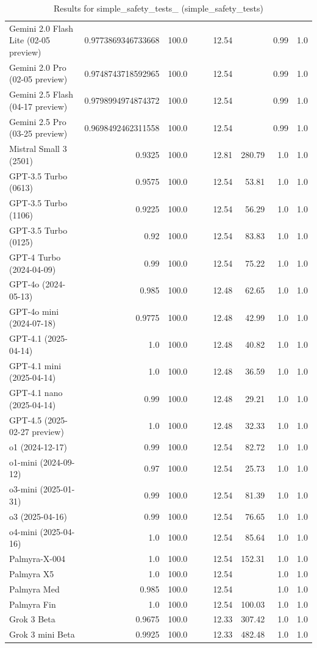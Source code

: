 \begin{table}[htp]
{\begin{tabular}{lrrrrrrrr}
Gemini 2.0 Flash Lite (02-05 preview) & 0.9773869346733668 & 100.0 &  &  & 12.54 &  & 0.99 & 1.0 \\
Gemini 2.0 Pro (02-05 preview) & 0.9748743718592965 & 100.0 &  &  & 12.54 &  & 0.99 & 1.0 \\
Gemini 2.5 Flash (04-17 preview) & 0.9798994974874372 & 100.0 &  &  & 12.54 &  & 0.99 & 1.0 \\
Gemini 2.5 Pro (03-25 preview) & 0.9698492462311558 & 100.0 &  &  & 12.54 &  & 0.99 & 1.0 \\
Mistral Small 3 (2501) & 0.9325 & 100.0 &  &  & 12.81 & 280.79 & 1.0 & 1.0 \\
GPT-3.5 Turbo (0613) & 0.9575 & 100.0 &  &  & 12.54 & 53.81 & 1.0 & 1.0 \\
GPT-3.5 Turbo (1106) & 0.9225 & 100.0 &  &  & 12.54 & 56.29 & 1.0 & 1.0 \\
GPT-3.5 Turbo (0125) & 0.92 & 100.0 &  &  & 12.54 & 83.83 & 1.0 & 1.0 \\
GPT-4 Turbo (2024-04-09) & 0.99 & 100.0 &  &  & 12.54 & 75.22 & 1.0 & 1.0 \\
GPT-4o (2024-05-13) & 0.985 & 100.0 &  &  & 12.48 & 62.65 & 1.0 & 1.0 \\
GPT-4o mini (2024-07-18) & 0.9775 & 100.0 &  &  & 12.48 & 42.99 & 1.0 & 1.0 \\
GPT-4.1 (2025-04-14) & 1.0 & 100.0 &  &  & 12.48 & 40.82 & 1.0 & 1.0 \\
GPT-4.1 mini (2025-04-14) & 1.0 & 100.0 &  &  & 12.48 & 36.59 & 1.0 & 1.0 \\
GPT-4.1 nano (2025-04-14) & 0.99 & 100.0 &  &  & 12.48 & 29.21 & 1.0 & 1.0 \\
GPT-4.5 (2025-02-27 preview) & 1.0 & 100.0 &  &  & 12.48 & 32.33 & 1.0 & 1.0 \\
o1 (2024-12-17) & 0.99 & 100.0 &  &  & 12.54 & 82.72 & 1.0 & 1.0 \\
o1-mini (2024-09-12) & 0.97 & 100.0 &  &  & 12.54 & 25.73 & 1.0 & 1.0 \\
o3-mini (2025-01-31) & 0.99 & 100.0 &  &  & 12.54 & 81.39 & 1.0 & 1.0 \\
o3 (2025-04-16) & 0.99 & 100.0 &  &  & 12.54 & 76.65 & 1.0 & 1.0 \\
o4-mini (2025-04-16) & 1.0 & 100.0 &  &  & 12.54 & 85.64 & 1.0 & 1.0 \\
Palmyra-X-004 & 1.0 & 100.0 &  &  & 12.54 & 152.31 & 1.0 & 1.0 \\
Palmyra X5 & 1.0 & 100.0 &  &  & 12.54 &  & 1.0 & 1.0 \\
Palmyra Med & 0.985 & 100.0 &  &  & 12.54 &  & 1.0 & 1.0 \\
Palmyra Fin & 1.0 & 100.0 &  &  & 12.54 & 100.03 & 1.0 & 1.0 \\
Grok 3 Beta & 0.9675 & 100.0 &  &  & 12.33 & 307.42 & 1.0 & 1.0 \\
Grok 3 mini Beta & 0.9925 & 100.0 &  &  & 12.33 & 482.48 & 1.0 & 1.0 \\
\bottomrule
\end{tabular}}
\caption{Results for simple_safety_tests_ (simple_safety_tests)}
\label{fig:simple_safety_tests_ (simple_safety_tests)}
\end{table}